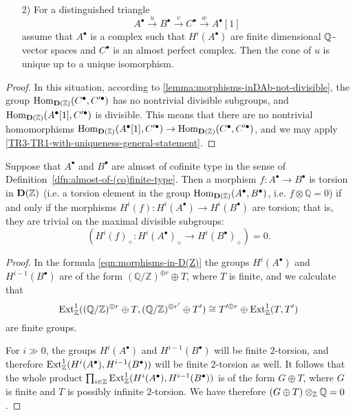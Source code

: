\documentclass{article}
\numberwithin{equation}{section}
\begin{document}
\begin{appendices}
\begin{corollary}
\begin{enumerate}
  \item[2)] For a distinguished triangle
    $$A^\bullet \xrightarrow{u} B^\bullet \xrightarrow{v} C^\bullet \xrightarrow{w} A^\bullet[1]$$
    assume that $A^\bullet$ is a complex such that $H^i (A^\bullet)$ are finite
    dimensional $\mathbb{Q}$-vector spaces and $C^\bullet$ is an almost perfect
    complex. Then the cone of $u$ is unique up to a unique isomorphism.
  \end{enumerate}

  \begin{proof}
    In this situation, according to \ref{lemma:morphisms-inDAb-not-divisible},
    the group $\operatorname{Hom}_{\mathbf{D} (\mathbb{Z})} (C^\bullet, C'^\bullet)$ has no
    nontrivial divisible subgroups, and
    $\operatorname{Hom}_{\mathbf{D} (\mathbb{Z})} (A^\bullet [1], C'^\bullet)$ is divisible. This
    means that there are no nontrivial homomorphisms
    $\operatorname{Hom}_{\mathbf{D} (\mathbb{Z})} (A^\bullet [1], C'^\bullet) \to \operatorname{Hom}_{\mathbf{D} (\mathbb{Z})} (C^\bullet, C'^\bullet)$,
    and we may apply \ref{TR3-TR1-with-uniqueness-general-statement}.
  \end{proof}
\end{corollary}

\begin{lemma}
  \label{lemma:torsion-morphisms-in-D(Z)}
  Suppose that $A^\bullet$ and $B^\bullet$ are almost of cofinite type in the
  sense of Definition~\ref{dfn:almost-of-(co)finite-type}. Then a morphism
  $f\colon A^\bullet\to B^\bullet$ is torsion in $\mathbf{D} (\mathbb{Z})$
  (i.e. a torsion element in the group
  $\operatorname{Hom}_{\mathbf{D} (\mathbb{Z})} (A^\bullet, B^\bullet)$, i.e.
  $f\otimes \mathbb{Q} = 0$) if and only if the morphisms
  $H^i (f)\colon H^i (A^\bullet) \to H^i (B^\bullet)$
  are torsion; that is, they are trivial on the maximal divisible subgroups:
  $$(H^i (f)_\div\colon H^i (A^\bullet)_\div \to H^i (B^\bullet)_\div) = 0.$$

  \begin{proof}
    In the formula \eqref{eqn:morphisms-in-D(Z)} the groups $H^i (A^\bullet)$
    and $H^{i-1} (B^\bullet)$ are of the form
    $(\mathbb{Q}/\mathbb{Z})^{\oplus r} \oplus T$, where $T$ is finite, and we
    calculate that
    \[ \operatorname{Ext}_{\mathbb{Z}}^1 ((\mathbb{Q}/\mathbb{Z})^{\oplus r} \oplus T, (\mathbb{Q}/\mathbb{Z})^{\oplus r'} \oplus T') \cong
    T'^{\oplus r} \oplus \operatorname{Ext}_{\mathbb{Z}}^1 (T, T') \]
    are finite groups.

    For $i \gg 0$, the groups $H^i (A^\bullet)$ and $H^{i-1} (B^\bullet)$ will
    be finite $2$-torsion, and therefore
    $\operatorname{Ext}_{\mathbb{Z}}^1 (H^i (A^\bullet), H^{i-1} (B^\bullet))$ will be finite
    $2$-torsion as well. It follows that the whole product
    $\prod_{i\in \mathbb{Z}} \operatorname{Ext}_{\mathbb{Z}}^1 (H^i (A^\bullet), H^{i-1} (B^\bullet))$
    is of the form $G \oplus T$, where $G$ is finite and $T$ is possibly
    infinite $2$-torsion. We have therefore $(G \oplus T)\otimes_{\mathbb{Z}} \mathbb{Q} = 0$.


\end{proof}
\end{lemma}
\end{appendices}
\end{document}

